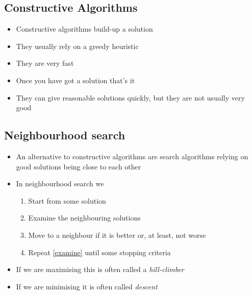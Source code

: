 
\begin{slide}
\section[-1]{Constructive Algorithms}

\pb
\begin{minipage}{0.67\linewidth}
  \begin{itemize}
  \item Constructive algorithms build-up a solution\pauseh
  \item They usually rely on a greedy heuristic\pauseh
  \item They are very fast\pauseh
  \item Once you have got a solution that's it\pauseh
  \item They can give reasonable solutions quickly, but they are not
    usually very good\pauseh
  \end{itemize}
\end{minipage}
\begin{minipage}{0.3\linewidth}
  \pause
\end{minipage}

\end{slide}


\begin{slide}
\section{Neighbourhood search}

\begin{PauseHighLight}
  \begin{itemize}
  \item An alternative to constructive algorithms are search algorithms
    relying on good solutions being close to each other\pause
  \item In neighbourhood search we\pause
    \begin{enumerate}
    \item Start from some solution\pause
    \item Examine the neighbouring solutions \label{examine}\pause
    \item Move to a neighbour if it is better or, at least, not worse\pause
    \item Repeat \ref{examine} until some stopping criteria\pause
    \end{enumerate}
  \item If we are maximising this is often called a
    \emph{hill-climber}\pause
  \item If we are minimising it is often called \emph{descent}\pause
  \end{itemize}
\end{PauseHighLight}

\end{slide}

